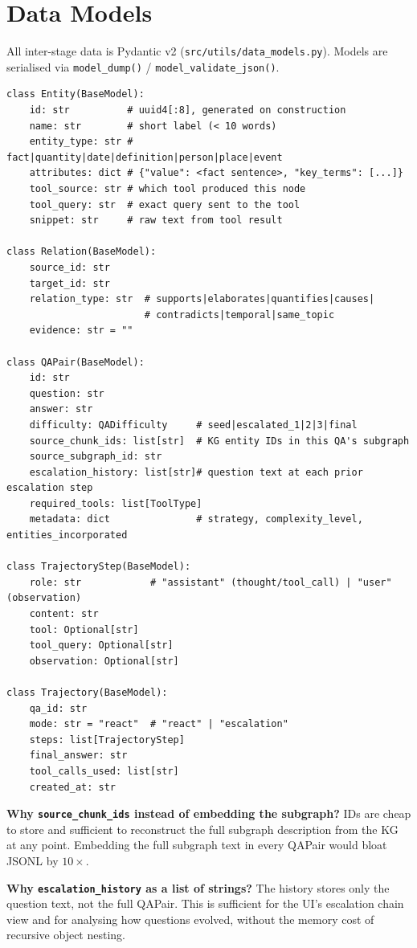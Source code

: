 \documentclass[11pt,a4paper]{article}
\begin{document}
\section{Data Models}
\label{sec:models}

All inter-stage data is Pydantic v2 (\texttt{src/utils/data\_models.py}). Models are serialised via \texttt{model\_dump()} / \texttt{model\_validate\_json()}.

\begin{lstlisting}[style=py, caption=Core data models]
class Entity(BaseModel):
    id: str          # uuid4[:8], generated on construction
    name: str        # short label (< 10 words)
    entity_type: str # fact|quantity|date|definition|person|place|event
    attributes: dict # {"value": <fact sentence>, "key_terms": [...]}
    tool_source: str # which tool produced this node
    tool_query: str  # exact query sent to the tool
    snippet: str     # raw text from tool result

class Relation(BaseModel):
    source_id: str
    target_id: str
    relation_type: str  # supports|elaborates|quantifies|causes|
                        # contradicts|temporal|same_topic
    evidence: str = ""

class QAPair(BaseModel):
    id: str
    question: str
    answer: str
    difficulty: QADifficulty     # seed|escalated_1|2|3|final
    source_chunk_ids: list[str]  # KG entity IDs in this QA's subgraph
    source_subgraph_id: str
    escalation_history: list[str]# question text at each prior escalation step
    required_tools: list[ToolType]
    metadata: dict               # strategy, complexity_level, entities_incorporated

class TrajectoryStep(BaseModel):
    role: str            # "assistant" (thought/tool_call) | "user" (observation)
    content: str
    tool: Optional[str]
    tool_query: Optional[str]
    observation: Optional[str]

class Trajectory(BaseModel):
    qa_id: str
    mode: str = "react"  # "react" | "escalation"
    steps: list[TrajectoryStep]
    final_answer: str
    tool_calls_used: list[str]
    created_at: str
\end{lstlisting}

\textbf{Why \texttt{source\_chunk\_ids} instead of embedding the subgraph?} IDs are cheap to store and sufficient to reconstruct the full subgraph description from the KG at any point. Embedding the full subgraph text in every QAPair would bloat JSONL by $10\times$.

\textbf{Why \texttt{escalation\_history} as a list of strings?} The history stores only the question text, not the full QAPair. This is sufficient for the UI's escalation chain view and for analysing how questions evolved, without the memory cost of recursive object nesting.
\end{document}
